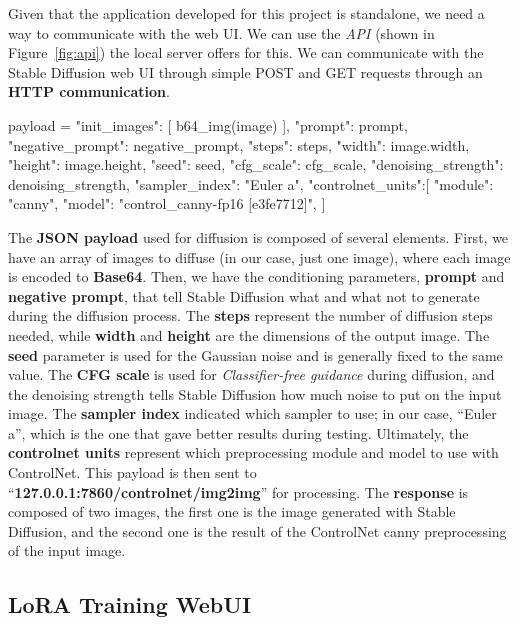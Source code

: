 \documentclass[preprint]{elsarticle}
\begin{document}
Given that the application developed for this project is standalone, 
we need a way to communicate with the web UI. We can use the \emph{API}  (shown in Figure~\ref{fig:api}) 
the local server offers for this.
We can communicate with the Stable Diffusion web UI through simple 
POST and GET requests through an \textbf{HTTP communication}. 
\begin{python}
	payload = {
		"init_images": [
		b64_img(image)
		],
		"prompt": prompt,
		"negative_prompt": negative_prompt,
		"steps": steps,
		"width": image.width,
		"height": image.height,
		"seed": seed,
		"cfg_scale": cfg_scale,
		"denoising_strength": denoising_strength,
		"sampler_index": "Euler a",
		"controlnet_units":[
		{
			"module": "canny",
			"model": "control_canny-fp16 [e3fe7712]",
		}
		]
	}
\end{python}
The \textbf{JSON payload} used for diffusion is composed of several elements.
First, we have an array of images to diffuse (in our case, just one image), 
where each image is encoded to \textbf{Base64}. 
Then, we have the conditioning parameters, \textbf{prompt} and \textbf{negative prompt}, 
that tell Stable Diffusion what and what not to generate during the diffusion process. 
The \textbf{steps} represent the number of diffusion steps needed, while \textbf{width} 
and \textbf{height} are the dimensions of the output image. 
The \textbf{seed} parameter is used for the Gaussian noise and is generally fixed to the same value. 
The \textbf{CFG scale} is used for \emph{Classifier-free guidance} during diffusion, 
and the denoising strength tells Stable Diffusion how much noise to put on the input image. 
The \textbf{sampler index} indicated which sampler to use; in our case, ``Euler a'', 
which is the one that gave better results during testing.
Ultimately, the \textbf{controlnet units} represent which preprocessing module and model to use with ControlNet.
This payload is then sent to ``\textbf{127.0.0.1:7860/controlnet/img2img}'' for processing. 
The \textbf{response} is composed of two images, the first one is the image generated with Stable Diffusion, 
and the second one is the result of the ControlNet canny preprocessing of the input image.

\subsection{LoRA Training WebUI} \label{sec:lora_training_webui}

\end{document}
